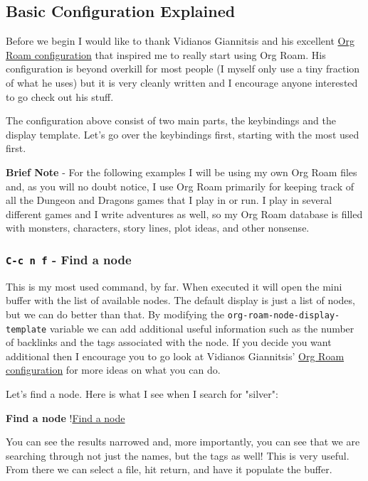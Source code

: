 \documentclass[11pt]{article}
\begin{document}
\subsection*{Basic Configuration Explained}
\label{sec:orgccc9902}
Before we begin I would like to thank Vidianos Giannitsis and his excellent \href{https://github.com/Vidianos-Giannitsis/Dotfiles/blob/master/emacs/.emacs.d/libs/zettelkasten.org}{Org Roam configuration} that inspired me to really start using Org Roam. His configuration is beyond overkill for most people (I myself only use a tiny fraction of what he uses) but it is very cleanly written and I encourage anyone interested to go check out his stuff.

The configuration above consist of two main parts, the keybindings and the display template. Let's go over the keybindings first, starting with the most used first.

\textbf{Brief Note} - For the following examples I will be using my own Org Roam files and, as you will no doubt notice, I use Org Roam primarily for keeping track of all the Dungeon and Dragons games that I play in or run. I play in several different games and I write adventures as well, so my Org Roam database is filled with monsters, characters, story lines, plot ideas, and other nonsense.
\subsubsection*{\texttt{C-c n f} - Find a node}
\label{sec:org2698877}

This is my most used command, by far. When executed it will open the mini buffer with the list of available nodes. The default display is just a list of nodes, but we can do better than that. By modifying the \texttt{org-roam-node-display-template} variable we can add additional useful information such as the number of backlinks and the tags associated with the node. If you decide you want additional then I encourage you to go look at Vidianos Giannitsis' \href{https://github.com/Vidianos-Giannitsis/Dotfiles/blob/master/emacs/.emacs.d/libs/zettelkasten.org}{Org Roam configuration} for more ideas on what you can do.

Let's find a node. Here is what I see when I search for "silver":

\textbf{Find a node}
!\href{images/org-roam-find-node.png}{Find a node}

You can see the results narrowed and, more importantly, you can see that we are searching through not just the names, but the tags as well! This is very useful. From there we can select a file, hit return, and have it populate the buffer.
\end{document}
